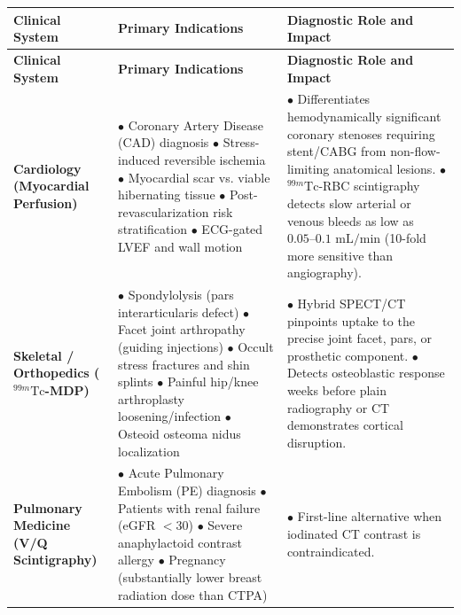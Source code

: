\documentclass[11pt,a4paper]{article}
\begin{document}
\begin{longtable}{p{3.2cm}p{6cm}p{6cm}}
\toprule
\textbf{Clinical System} & \textbf{Primary Indications} & \textbf{Diagnostic Role and Impact} \\
\midrule
\endfirsthead
\toprule
\textbf{Clinical System} & \textbf{Primary Indications} & \textbf{Diagnostic Role and Impact} \\
\midrule
\endhead
\bottomrule
\endfoot
\textbf{Cardiology (Myocardial Perfusion)} & 
$\bullet$ Coronary Artery Disease (CAD) diagnosis\newline
$\bullet$ Stress-induced reversible ischemia\newline
$\bullet$ Myocardial scar vs. viable hibernating tissue\newline
$\bullet$ Post-revascularization risk stratification\newline
$\bullet$ ECG-gated LVEF and wall motion & 
$\bullet$ Differentiates hemodynamically significant coronary stenoses requiring stent/CABG from non-flow-limiting anatomical lesions.\newline
$\bullet$ $^{99m}\text{Tc}$-RBC scintigraphy detects slow arterial or venous bleeds as low as $0.05\text{--}0.1\text{ mL/min}$ (10-fold more sensitive than angiography). \\
\midrule
\textbf{Skeletal / Orthopedics ($^{99m}\text{Tc}$-MDP)} & 
$\bullet$ Spondylolysis (pars interarticularis defect)\newline
$\bullet$ Facet joint arthropathy (guiding injections)\newline
$\bullet$ Occult stress fractures and shin splints\newline
$\bullet$ Painful hip/knee arthroplasty loosening/infection\newline
$\bullet$ Osteoid osteoma nidus localization & 
$\bullet$ Hybrid SPECT/CT pinpoints uptake to the precise joint facet, pars, or prosthetic component.\newline
$\bullet$ Detects osteoblastic response weeks before plain radiography or CT demonstrates cortical disruption. \\
\midrule
\textbf{Pulmonary Medicine (V/Q Scintigraphy)} & 
$\bullet$ Acute Pulmonary Embolism (PE) diagnosis\newline
$\bullet$ Patients with renal failure (eGFR $<30$)\newline
$\bullet$ Severe anaphylactoid contrast allergy\newline
$\bullet$ Pregnancy (substantially lower breast radiation dose than CTPA) & 
$\bullet$ First-line alternative when iodinated CT contrast is contraindicated.\newline

\end{longtable}
\end{document}
